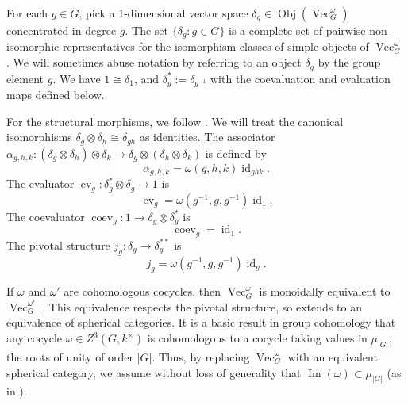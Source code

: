 \documentclass{amsart}
\DeclareMathOperator{\id}{id}
\DeclareMathOperator{\Vect}{Vec}
\DeclareMathOperator{\Obj}{Obj}
\DeclareMathOperator{\Img}{Im}
\DeclareMathOperator{\coev}{coev}
\DeclareMathOperator{\ev}{ev}
\newcommand{\one}{1}
\begin{document}
For each $g \in G$, pick a 1-dimensional vector space $\delta_g \in \Obj(\Vect_G^\omega)$ concentrated in degree $g$.  The set $\{\delta_g : g \in G\}$ is a complete set of pairwise non-isomorphic representatives for the isomorphism classes of simple objects of $\Vect_G^\omega$.  We will sometimes abuse notation by referring to an object $\delta_g$ by the group element $g$.  We have $\one \cong \delta_1$, and  $\delta_g^* := \delta_{g^{-1}}$ with the coevaluation and evaluation maps defined below.

For the structural morphisms,  we follow \cite{math/0601012}.  We will treat the canonical isomorphisms $\delta_g \otimes \delta_h \cong \delta_{gh}$ as identities.    The associator $\alpha_{g,h,k}:(\delta_g \otimes \delta_h) \otimes \delta_k \to \delta_g \otimes (\delta_h \otimes \delta_k)$ is defined by
$$\alpha_{g,h,k} = \omega(g,h,k) \id_{ghk}.$$ 
The evaluator $\ev_g:\delta_g^* \otimes \delta_g \to 1$ is 
$$\ev_{g} = \omega(g^{-1},g,g^{-1}) \id_1.$$  
The coevaluator $\coev_g:1 \to \delta_g \otimes \delta_g^*$ is 
$$\coev_{g} = \id_1.$$ 
The pivotal structure $j_g:\delta_g \to \delta_g^{**}$ is 
$$j_{g} = \omega(g^{-1},g,g^{-1}) \id_{g}.$$

If $\omega$ and $\omega'$ are cohomologous cocycles, then $\Vect_G^\omega$ is monoidally equivalent to $\Vect_G^{\omega'}$ \cite{etingofTensor}.  This equivalence respects the pivotal structure, so extends to an equivalence of spherical categories.  It is a basic result in group cohomology that any cocycle $\omega \in Z^3(G, k^\times)$ is cohomologous to a cocycle taking values in $\mu_{|G|}$, the roots of unity of order $|G|$.  Thus, by replacing $\Vect^\omega_G$ with an equivalent spherical category, we assume  without loss of generality that $\Img(\omega) \subset \mu_{|G|}$ (as in \cite{erw}).  

\newcommand{\ee}{\mathbf{e}}       %
\newcommand{\A}{\mathcal{A}}      %
\newcommand{\st}{\; | \;}                               %
\newcommand{\ttt}{\otimes}                              %
\newcommand{\cc}[1]{\underset{\scriptstyle #1}{\circ}}
\newcommand{\ccc}[1]{\underset{\scriptstyle #1}{\bullet}}
\newcommand{\ti}{\tilde}
\newcommand{\ov}{\overline}
\newcommand{\del}{\partial}
\newcommand{\<}{\langle}
\renewcommand{\>}{\rangle}
\newcommand{\surjto}{\twoheadrightarrow}      %
\newcommand{\injto}{\hookrightarrow}          %
\newcommand{\isoto}{\xrightarrow{\sim}}       %
\newcommand{\xxto}{\xrightarrow}              %
\newcommand{\firef}[1]{Figure~{\rm\ref{#1}}}
\newcommand{\R}{\mathbb{R}}       %
\end{document}
